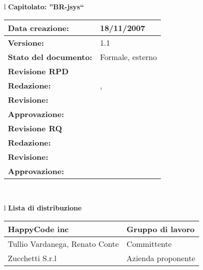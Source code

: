 

\newcommand{\lv}{ 1.1 } %
\newcommand{\dt}{ Definizione del Prodotto }%


\begin{center}
\thispagestyle{plain}
\begin{table}[htbp]
\large{
\begin{tabular}{l}
\Large{\textbf{\textsf{Capitolato: ''BR-jsys``}}} \\
\begin{tabular}{|p{6cm}|p{6cm}|}
\hline
\textbf{Data creazione:} & 18/11/2007 \\ \hline
\textbf{Versione:} & \lv \\ \hline
\textbf{Stato del documento:} & Formale, esterno \\ \hline
\textbf{Revisione RPD} &   \\ \hline
\textbf{Redazione:} & \FC, \LA \\ \hline
\textbf{Revisione:} & \MB   \\ \hline
\textbf{Approvazione:}  & \LA \\ \hline
\textbf{Revisione RQ} &   \\ \hline
\textbf{Redazione:} & \ET \\ \hline
\textbf{Revisione:} &   \\ \hline
\textbf{Approvazione:}  & \\ \hline
\end{tabular} \\
\end{tabular}
}
\end{table}

\begin{table}[hbtp]
\large{
\begin{tabular}{l}
\Large{\textbf{\textsf{Lista di distribuzione}}} \\

\begin{tabular}{|p{6cm}|p{6cm}|} \hline
{HappyCode inc}& Gruppo di lavoro\\ \hline
{Tullio Vardanega, Renato Conte}& Committente \\ \hline
{Zucchetti S.r.l}& Azienda proponente\\ \hline
\end{tabular} \\
\end{tabular}
}
\end{table}
\begin{table}[hbtp]


\end{table}
\end{center}
